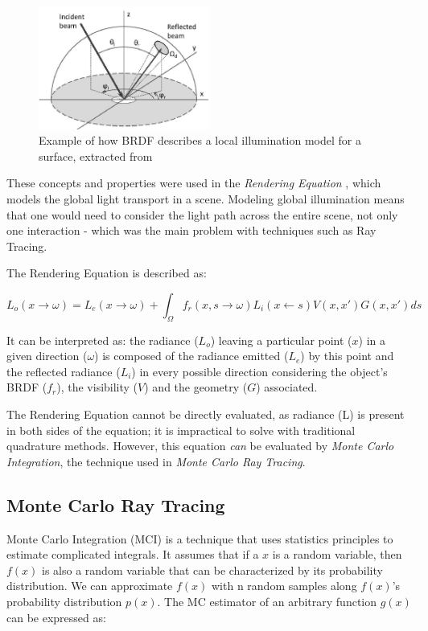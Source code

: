 \begin{figure}[h]
  \centering
  \includegraphics[width=0.5\textwidth,height=\textheight,keepaspectratio]{images/3_theoretical_foundations/brdf.png}
  \caption{Example of how BRDF describes a local illumination model for a surface, extracted from \cite{brdf}}
  \label{fig:brdf}
\end{figure}


These concepts and properties were used in the \textit{Rendering Equation} \cite{Kajiya:1986}, which models the global light transport in a scene. Modeling global illumination means that one would need to consider the light path across the entire scene, not only one interaction - which was the main problem with techniques such as Ray Tracing. 

The Rendering Equation is described as:

$$L_o (x \rightarrow \omega) = L_e (x \rightarrow \omega) + \int_{\Omega} f_r (x, s \rightarrow \omega) L_i (x \leftarrow s) V(x, x') G(x, x') ds $$

It can be interpreted as: the radiance ($L_o$) leaving a particular point ($x$) in a given direction ($\omega$) is composed of the radiance emitted ($L_e$) by this point and the reflected radiance ($L_i$) in every possible direction considering the object's BRDF ($f_r$), the visibility ($V$) and the geometry ($G$) associated. 

The Rendering Equation cannot be directly evaluated, as radiance (L) is present in both sides of the equation; it is impractical to solve with traditional quadrature methods. However, this equation \textit{can} be evaluated by \textit{Monte Carlo Integration}, the technique used in \textit{Monte Carlo Ray Tracing}.

\subsection{Monte Carlo Ray Tracing}

Monte Carlo Integration (MCI) is a technique that uses statistics principles to estimate complicated integrals. It assumes that if a $x$ is a random variable, then $f(x)$ is also a random variable that can be characterized by its probability distribution. We can approximate $f(x)$ with n random samples along $f(x)$'s probability distribution $p(x)$. The MC estimator of an arbitrary function $g(x)$ can be expressed as:

